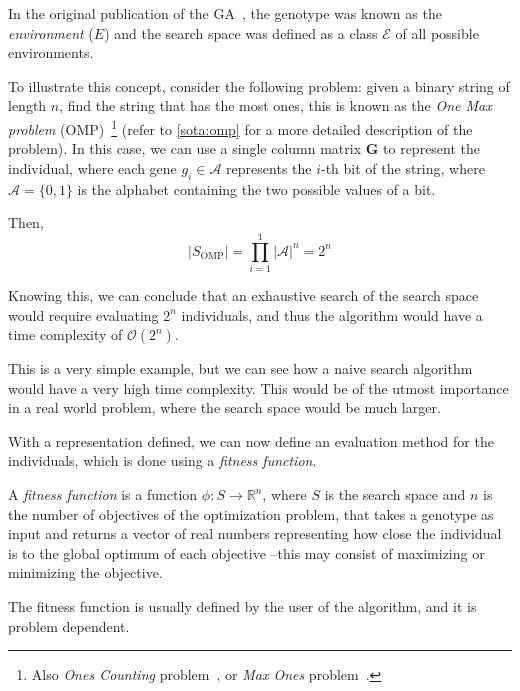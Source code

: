     \begin{remark}
        In the original publication of the GA~\autocite{hollandAdaptationNaturalArtificial1992a}, the genotype was 
        known as the \emph{environment} (\(E\)) and the search space was defined as a class \(\mathcal{E}\) of all 
        possible environments.
    \end{remark}

    To illustrate this concept, consider the following problem: given a binary string of length \(n\), find the string 
    that has the most ones, this is known as the \emph{One Max problem} 
    (OMP)~\autocite{andonovUnboundedKnapsackProblem2000}\footnote{
        Also \emph{Ones Counting} problem~\autocite{wilhelmstotterJeneticsJavaGenetica}, or \emph{Max Ones} problem~\autocite{ECJ}.
    } (refer to \vref{sota:omp} for a more detailed description of the problem).
    In this case, we can use a single column matrix \(\mathbf{G}\) to represent the individual, where each gene \(g_i 
    \in \mathcal{A}\) represents the \(i\)-th bit of the string, where \(\mathcal{A} = \{0, 1\}\) is the alphabet 
    containing the two possible values of a bit.
    
    Then,
    \[
        |S_\mathrm{OMP}| = \prod_{i=1}^1 |\mathcal{A}|^n = 2^n
    \]

    Knowing this, we can conclude that an exhaustive search of the search space would require evaluating \(2^n\) 
    individuals, and thus the algorithm would have a time complexity of \(\mathcal{O}(2^n)\).
    
    This is a very simple example, but we can see how a naive search algorithm would have a very high time complexity.
    This would be of the utmost importance in a real world problem, where the search space would be much larger.

    With a representation defined, we can now define an evaluation method for the individuals, which is done using a 
    \emph{fitness function}.

    \begin{definition}
    \label{def:fitness_function}
        A \emph{fitness function} is a function \(\phi: S \rightarrow \mathbb{R}^n\), where \(S\) is the search space 
        and \(n\) is the number of objectives of the optimization problem, that takes a genotype as input and returns a 
        vector of real numbers representing how close the individual is to the global optimum of each objective --this 
        may consist of maximizing or minimizing the objective.

        The fitness function is usually defined by the user of the algorithm, and it is problem dependent.
    \end{definition}

